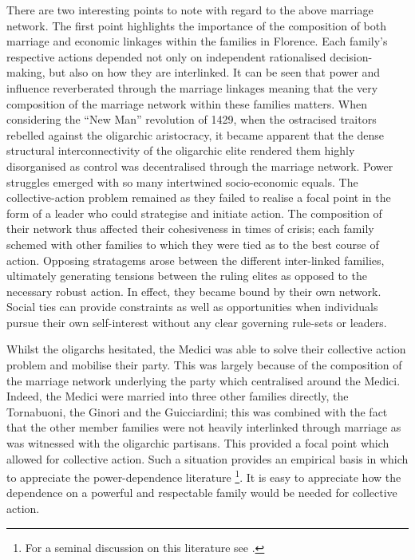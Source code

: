 There are two interesting points to note with regard to the above marriage network. The first point highlights the importance of the composition of both marriage and economic linkages within the families in Florence. Each family's respective actions depended not only on independent rationalised decision-making, but also on how they are interlinked. It can be seen that power and influence reverberated through the marriage linkages meaning that the very composition of the marriage network within these families matters. When considering the ``New Man'' revolution of 1429, when the ostracised traitors rebelled against the oligarchic aristocracy, it became apparent that the dense structural interconnectivity of the oligarchic elite rendered them highly disorganised as control was decentralised through the marriage network. Power struggles emerged with so many intertwined socio-economic equals. The collective-action problem remained as they failed to realise a focal point in the form of a leader who could strategise and initiate action. The composition of their network thus affected their cohesiveness in times of crisis; each family schemed with other families to which they were tied as to the best course of action. Opposing stratagems arose between the different inter-linked families, ultimately generating tensions between the ruling elites as opposed to the necessary robust action. In effect, they became bound by their own network. Social ties can provide constraints as well as opportunities when individuals pursue their own self-interest without any clear governing rule-sets or leaders.

Whilst the oligarchs hesitated, the Medici was able to solve their collective action problem and mobilise their party. This was largely because of the composition of the marriage network underlying the party which centralised around the Medici. Indeed, the Medici were married into three other families directly, the Tornabuoni, the Ginori and the Guicciardini; this was combined with the fact that the other member families were not heavily interlinked through marriage as was witnessed with the oligarchic partisans. This provided a focal point which allowed for collective action. Such a situation provides an empirical basis in which to appreciate the power-dependence literature \footnote{For a seminal discussion on this literature see \citet{Emerson1962}.}. It is easy to appreciate how the dependence on a powerful and respectable family would be needed for collective action.

